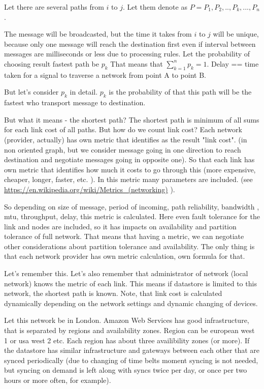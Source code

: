 \documentclass{llncs}
\begin{document}
Let there are several paths from $i$ to $j$. Let them denote as
$P = {P_1, P_2, .., P_k, ..., P_n}$.

The message will be broadcasted, but the time it takes from $i$ to $j$
will be unique, because only one message will reach the destination first
even if interval between messages are milliseconds or less due to processing rules.
Let the probability of choosing result fastest path be $p_k$
That means that $\sum_{k=1}^{n} p_k = 1 $.
Delay == time taken for a signal to traverse a network from point A to point B.

But let's consider $p_k$ in detail.
$p_k$ is the probability of that this path will be the fastest who transport message
to destination.

But what it means - the shortest path? The shortest path is minimum of all sums for each link
cost of all paths. But how do we count link cost?
Each network (provider, actually) has own metric that identifies as the result "link cost".
(in non oriented graph, but we consider message going in one direction to reach destination and negotiate messages going in opposite one).
So that each link has own metric that identifies how much it costs to go through this (more expensive, cheaper, longer, faster, etc. ). In this metric many parameters are included.
(see \url{https://en.wikipedia.org/wiki/Metrics_(networking)} ).

So depending on size of message, period of incoming, path reliability, bandwidth , mtu, throughput, delay, this metric is calculated. Here even fault tolerance for the link and nodes are included, so it has impacts on availability and partition tolerance of full network. That means that having a metric, we can negotiate other considerations about partition tolerance and availability. 
The only thing is that each network provider has own metric calculation, own formula for that.

Let's remember this. Let's also remember that administrator of network (local network) knows the metric of each link. This means if datastore is limited to this network, the shortest path is known. Note, that link cost is calculated dynamically depending on the network settings and dynamic changing of devices.

Let this network be in London. 
Amazon Web Services has good infrastructure, that is separated by regions and availability zones. Region can be european west 1 or usa west 2 etc. Each region has about three availibility zones (or more).
If the datastore has similar infrastructure and gateways between each other that are synced periodically (due to changing of time belts moment syncing is not needed, but syncing on demand is left along with syncs twice per day, or once per two hours or more often, for example).
\end{document}
